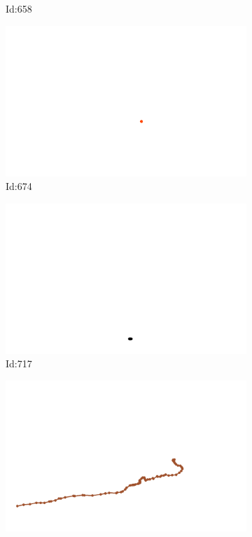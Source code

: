 \documentclass[12pt,twoside]{report}
\begin{document}
\begin{figure}
\begin{subfigure}[b]{0.20\textwidth}
\caption{Id:658}
\end{subfigure}
\begin{subfigure}[b]{0.20\textwidth}
\centering
\includegraphics[width=\textwidth]{../trajectories/674.png}
\caption{Id:674}
\end{subfigure}
\begin{subfigure}[b]{0.20\textwidth}
\centering
\includegraphics[width=\textwidth]{../trajectories/717.png}
\caption{Id:717}
\end{subfigure}
\begin{subfigure}[b]{0.20\textwidth}
\centering
\includegraphics[width=\textwidth]{../trajectories/733.png}

\end{subfigure}
\end{figure}
\end{document}
